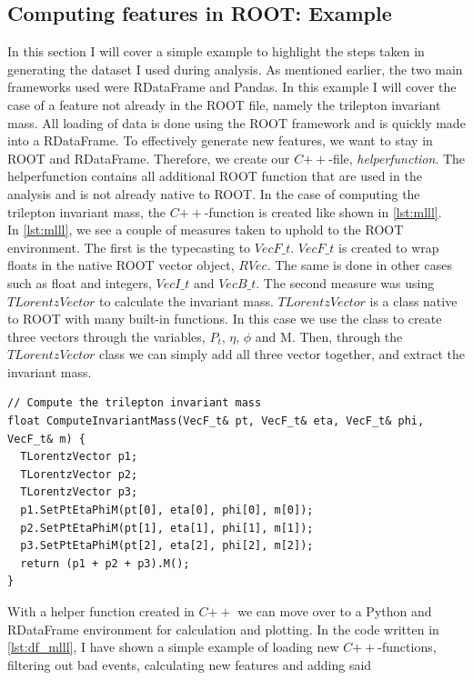 \subsection{Computing features in ROOT: Example}
In this section I will cover a simple example to highlight the steps taken in generating the dataset 
I used during analysis. As mentioned earlier, the two main frameworks used were RDataFrame and Pandas. 
In this example I will cover the case of a feature not already in the ROOT file, namely the trilepton
invariant mass. All loading of data is done using the ROOT framework and is quickly made into a 
RDataFrame. To effectively generate new features, we want to stay in ROOT and RDataFrame. Therefore,
we create our $C{++}$-file, \emph{helperfunction}. The helperfunction contains all additional 
ROOT function that are used in the analysis and is not already native to ROOT. In the case 
of computing the trilepton invariant mass, the $C{++}$-function is created like shown in 
\ref{lst:mlll}.
\\
In \ref{lst:mlll}, we see a couple of measures taken to uphold to the ROOT environment. The first is 
the typecasting to $VecF\_t$. $VecF\_t$ is created to wrap floats in the native ROOT vector object, $RVec$. 
The same is done in other cases such as float and integers, $VecI\_t$ and $VecB\_t$. The second measure
was using $TLorentzVector$ \cite{TLorentzVector} to calculate the invariant mass. $TLorentzVector$ is a class
native to ROOT with many built-in functions. In this case we use the class to create three vectors through the 
variables, $P_t$, $\eta$, $\phi$ and M. Then, through the $TLorentzVector$ class we can simply
add all three vector together, and extract the invariant mass. 
\lstset{style=Cpp}
\begin{lstlisting}[caption={$C{++}$-function for $M_{lll}$.},captionpos=b, label={lst:mlll}]
// Compute the trilepton invariant mass 
float ComputeInvariantMass(VecF_t& pt, VecF_t& eta, VecF_t& phi, VecF_t& m) {
  TLorentzVector p1;
  TLorentzVector p2;
  TLorentzVector p3;
  p1.SetPtEtaPhiM(pt[0], eta[0], phi[0], m[0]);
  p2.SetPtEtaPhiM(pt[1], eta[1], phi[1], m[1]);
  p3.SetPtEtaPhiM(pt[2], eta[2], phi[2], m[2]);
  return (p1 + p2 + p3).M();
}
\end{lstlisting}
With a helper function created in $C{++}$ we can move over to a Python and RDataFrame environment
for calculation and plotting. In the code written in \ref{lst:df_mlll}, I have shown a simple example 
of loading new $C{++}$-functions, filtering out bad events, calculating new features and adding said 
